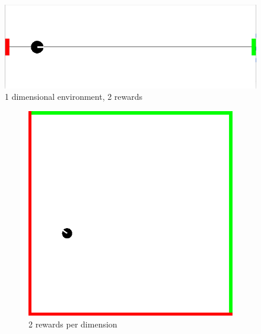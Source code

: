 \documentclass{article}
\begin{document}
\begin{figure}[H]
  \centering
  \includegraphics[width=0.3\linewidth]{env/visualizations/1d.png}
  \caption{1 dimensional environment, 2 rewards}
  \label{fig:1d_env}
  \vspace{2cm}
\end{figure}

\begin{figure}[H]
  \centering
    \hspace{2cm}
  \begin{subfigure}[b]{0.3\linewidth}
    \includegraphics[width=\linewidth]{env/visualizations/2d_2reward.png}
      \caption{2 rewards per dimension}
      \label{fig:2d_2_env}
  \end{subfigure}
    \hspace{2cm}
   \begin{subfigure}[b]{0.3\linewidth}

\end{subfigure}
\end{figure}
\end{document}
